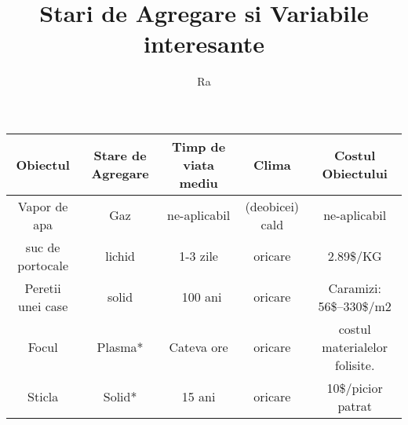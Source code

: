 \documentclass[12px]{article}
\title{Stari de Agregare si Variabile interesante}
\author{Ra}
\renewcommand{\maketitle}{
        \begin{center}

        {\huge\bfseries \thetitle}
        \newline

        \vspace{.25em}

        \end{center}
}
\begin{document}
  \maketitle
  \begin{center}
	  \begin{tabular}{|c|c|c|c|c|}
	  \hline
		  \textbf{Obiectul} & \textbf{Stare de Agregare} & \textbf{Timp de viata mediu} & \textbf{Clima}  & \textbf{Costul Obiectului} \\
	  \hline
		  Vapor de apa & Gaz &  ne-aplicabil & (deobicei) cald & ne-aplicabil \\
	  \hline
		  suc de portocale & lichid & 1-3 zile \parencite{orangejuicelife} & oricare & 2.89\$/KG \parencite{orangejuicecost}  \\
	  \hline
		  Peretii unei case & solid & ~100 ani \parencite{glasslife} & oricare & Caramizi: 56\$–330\$/m2 \parencite{wallcost} \\
	  \hline
		  Focul & Plasma* & Cateva ore & oricare & costul materialelor folisite.\\
	  \hline
		  Sticla & Solid* & 15 ani \parencite{glasslife} & oricare & 10\$/picior patrat \parencite{glasscost} \\
	  \hline

          \end{tabular}
  \end{center}
\end{document}

